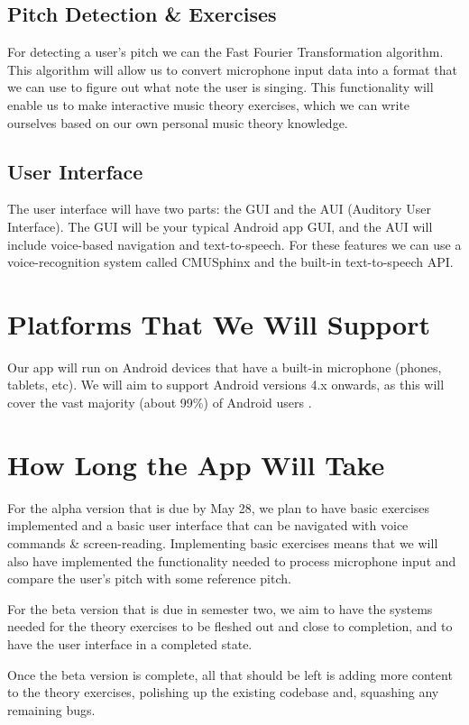 \documentclass{article}
\begin{document}
\subsection{Pitch Detection \& Exercises}
For detecting a user's pitch we can the Fast Fourier Transformation algorithm. This algorithm will allow us to convert microphone input data into a format that we can use to figure out what note the user is singing. This functionality will enable us to make interactive music theory exercises, which we can write ourselves based on our own personal music theory knowledge. 
\subsection{User Interface}
The user interface will have two parts: the GUI and the AUI (Auditory User Interface). The GUI will be your typical Android app GUI, and the AUI will include voice-based navigation and text-to-speech. For these features we can use a voice-recognition system called CMUSphinx and the built-in text-to-speech API.

\section{Platforms That We Will Support}
Our app will run on Android devices that have a built-in microphone (phones, tablets, etc). We will aim to support Android versions 4.x onwards, as this will cover the vast majority (about 99\%) of Android users \cite{googledevelopers}. 

\section{How Long the App Will Take}
For the alpha version that is due by May 28, we plan to have basic exercises implemented and a basic user interface that can be navigated with voice commands \& screen-reading. Implementing basic exercises means that we will also have implemented the functionality needed to process microphone input and compare the user's pitch with some reference pitch.

For the beta version that is due in semester two, we aim to have the systems needed for the theory exercises to be fleshed out and close to completion, and to have the user interface in a completed state.

Once the beta version is complete, all that should be left is adding more content to the theory exercises, polishing up the existing codebase and, squashing any remaining bugs.
\end{document}
